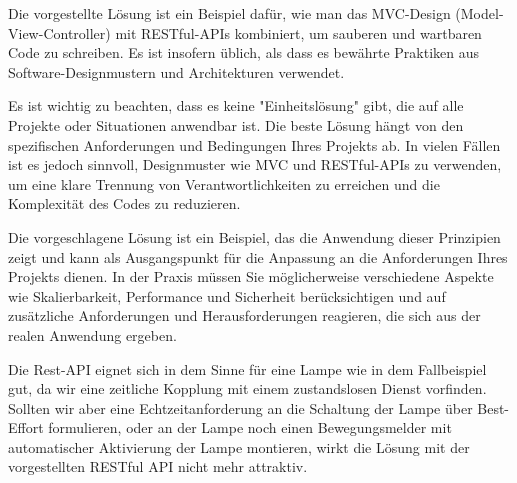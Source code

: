 Die vorgestellte Lösung ist ein Beispiel dafür, wie man das MVC-Design (Model-View-Controller) mit RESTful-APIs kombiniert, um sauberen und wartbaren Code zu schreiben. Es ist insofern üblich, als dass es bewährte Praktiken aus Software-Designmustern und Architekturen verwendet.

Es ist wichtig zu beachten, dass es keine "Einheitslösung" gibt, die auf alle Projekte oder Situationen anwendbar ist. Die beste Lösung hängt von den spezifischen Anforderungen und Bedingungen Ihres Projekts ab. In vielen Fällen ist es jedoch sinnvoll, Designmuster wie MVC und RESTful-APIs zu verwenden, um eine klare Trennung von Verantwortlichkeiten zu erreichen und die Komplexität des Codes zu reduzieren.

Die vorgeschlagene Lösung ist ein Beispiel, das die Anwendung dieser Prinzipien zeigt und kann als Ausgangspunkt für die Anpassung an die Anforderungen Ihres Projekts dienen. In der Praxis müssen Sie möglicherweise verschiedene Aspekte wie Skalierbarkeit, Performance und Sicherheit berücksichtigen und auf zusätzliche Anforderungen und Herausforderungen reagieren, die sich aus der realen Anwendung ergeben.

Die Rest-API eignet sich in dem Sinne für eine Lampe wie in dem Fallbeispiel gut, da wir eine zeitliche Kopplung mit einem zustandslosen Dienst vorfinden. Sollten wir aber eine Echtzeitanforderung an die Schaltung der Lampe über Best-Effort formulieren, oder an der Lampe noch einen Bewegungsmelder mit automatischer Aktivierung der Lampe montieren, wirkt die Lösung mit der vorgestellten RESTful API nicht mehr attraktiv. 

